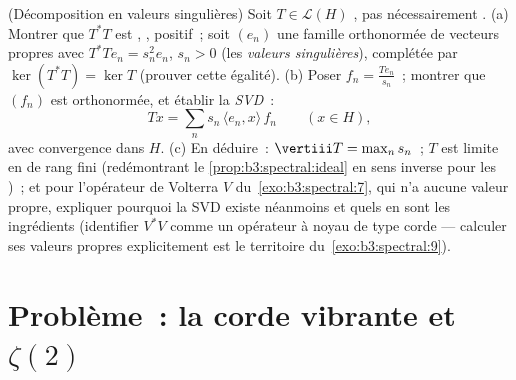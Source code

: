 \begin{exercise}[$\star\star\star$]\label{exo:b3:spectral:12}
(Décomposition en valeurs singulières) Soit $T \in \mathcal
L(H)$ \emph{}, pas nécessairement .
(a) Montrer que $T^*T$ est , , positif~;
soit $(e_n)$ une famille orthonormée de vecteurs propres avec
$T^*Te_n = s_n^2e_n$, $s_n > 0$ (les \emph{valeurs
singulières}), complétée par $\ker(T^*T) = \ker T$ (prouver
cette égalité).
(b) Poser $f_n = \frac{Te_n}{s_n}$~; montrer que $(f_n)$ est
orthonormée, et établir la \emph{SVD}~:
\[
Tx = \sum_n s_n\,\langle e_n, x\rangle\,f_n
\qquad (x \in H),
\]
avec convergence dans $H$.
(c) En déduire~: $\vertiii T = \max_ns_n$~; $T$ est limite en
 de rang fini (redémontrant le
\cref{prop:b3:spectral:ideal} en sens inverse pour les
)~; et pour l'opérateur de Volterra $V$ du~\cref{exo:b3:spectral:7}, qui n'a aucune valeur propre,
expliquer pourquoi la SVD existe néanmoins et quels en sont
les ingrédients (identifier $V^*V$ comme un opérateur à noyau
de type corde --- calculer ses valeurs propres explicitement
est le territoire du~\cref{exo:b3:spectral:9}).
\end{exercise}

\section{Problème~: la corde vibrante et
\texorpdfstring{$\zeta(2)$}{zeta(2)}}

